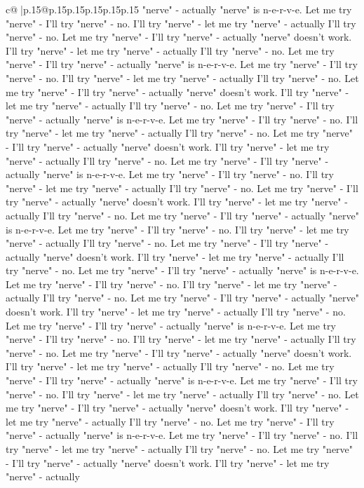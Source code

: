 \documentclass{article}
\begin{document}
{\begin{supertabular}{c@{$\;$}|p{.15\linewidth}@{}p{.15\linewidth}p{.15\linewidth}p{.15\linewidth}p{.15\linewidth}p{.15\linewidth}}
{{{"nerve" {-} actually "nerve" is n{-}e{-}r{-}v{-}e. Let me try "nerve" {-} I'll try "nerve" {-} no. I'll try "nerve" {-} let me try "nerve" {-} actually I'll try "nerve" {-} no. Let me try "nerve" {-} I'll try "nerve" {-} actually "nerve" doesn't work. I'll try "nerve" {-} let me try "nerve" {-} actually I'll try "nerve" {-} no. Let me try "nerve" {-} I'll try "nerve" {-} actually "nerve" is n{-}e{-}r{-}v{-}e. Let me try "nerve" {-} I'll try "nerve" {-} no. I'll try "nerve" {-} let me try "nerve" {-} actually I'll try "nerve" {-} no. Let me try "nerve" {-} I'll try "nerve" {-} actually "nerve" doesn't work. I'll try "nerve" {-} let me try "nerve" {-} actually I'll try "nerve" {-} no. Let me try "nerve" {-} I'll try "nerve" {-} actually "nerve" is n{-}e{-}r{-}v{-}e. Let me try "nerve" {-} I'll try "nerve" {-} no. I'll try "nerve" {-} let me try "nerve" {-} actually I'll try "nerve" {-} no. Let me try "nerve" {-} I'll try "nerve" {-} actually "nerve" doesn't work. I'll try "nerve" {-} let me try "nerve" {-} actually I'll try "nerve" {-} no. Let me try "nerve" {-} I'll try "nerve" {-} actually "nerve" is n{-}e{-}r{-}v{-}e. Let me try "nerve" {-} I'll try "nerve" {-} no. I'll try "nerve" {-} let me try "nerve" {-} actually I'll try "nerve" {-} no. Let me try "nerve" {-} I'll try "nerve" {-} actually "nerve" doesn't work. I'll try "nerve" {-} let me try "nerve" {-} actually I'll try "nerve" {-} no. Let me try "nerve" {-} I'll try "nerve" {-} actually "nerve" is n{-}e{-}r{-}v{-}e. Let me try "nerve" {-} I'll try "nerve" {-} no. I'll try "nerve" {-} let me try "nerve" {-} actually I'll try "nerve" {-} no. Let me try "nerve" {-} I'll try "nerve" {-} actually "nerve" doesn't work. I'll try "nerve" {-} let me try "nerve" {-} actually I'll try "nerve" {-} no. Let me try "nerve" {-} I'll try "nerve" {-} actually "nerve" is n{-}e{-}r{-}v{-}e. Let me try "nerve" {-} I'll try "nerve" {-} no. I'll try "nerve" {-} let me try "nerve" {-} actually I'll try "nerve" {-} no. Let me try "nerve" {-} I'll try "nerve" {-} actually "nerve" doesn't work. I'll try "nerve" {-} let me try "nerve" {-} actually I'll try "nerve" {-} no. Let me try "nerve" {-} I'll try "nerve" {-} actually "nerve" is n{-}e{-}r{-}v{-}e. Let me try "nerve" {-} I'll try "nerve" {-} no. I'll try "nerve" {-} let me try "nerve" {-} actually I'll try "nerve" {-} no. Let me try "nerve" {-} I'll try "nerve" {-} actually "nerve" doesn't work. I'll try "nerve" {-} let me try "nerve" {-} actually I'll try "nerve" {-} no. Let me try "nerve" {-} I'll try "nerve" {-} actually "nerve" is n{-}e{-}r{-}v{-}e. Let me try "nerve" {-} I'll try "nerve" {-} no. I'll try "nerve" {-} let me try "nerve" {-} actually I'll try "nerve" {-} no. Let me try "nerve" {-} I'll try "nerve" {-} actually "nerve" doesn't work. I'll try "nerve" {-} let me try "nerve" {-} actually I'll try "nerve" {-} no. Let me try "nerve" {-} I'll try "nerve" {-} actually "nerve" is n{-}e{-}r{-}v{-}e. Let me try "nerve" {-} I'll try "nerve" {-} no. I'll try "nerve" {-} let me try "nerve" {-} actually I'll try "nerve" {-} no. Let me try "nerve" {-} I'll try "nerve" {-} actually "nerve" doesn't work. I'll try "nerve" {-} let me try "nerve" {-} actually }}}
\end{supertabular}}
\end{document}
